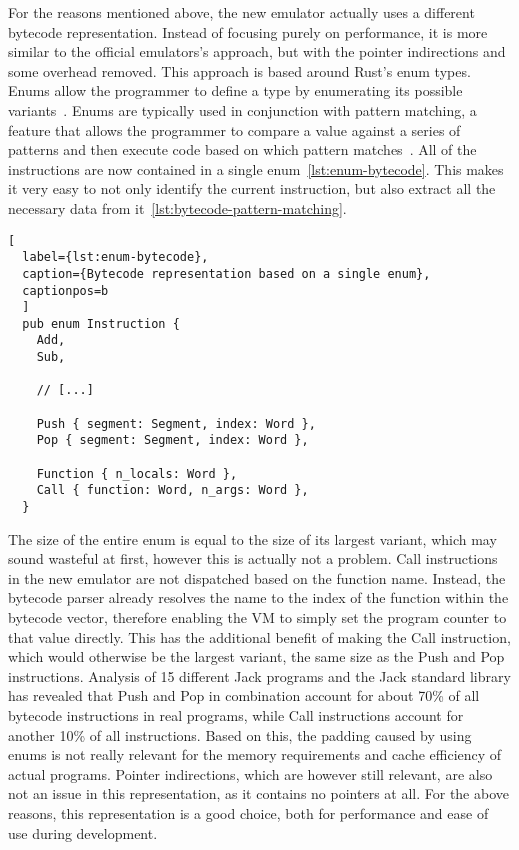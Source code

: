 For the reasons mentioned above, the new emulator actually uses a different bytecode representation. Instead of focusing purely on performance, it is more similar to the official emulators's approach, but with the pointer indirections and some overhead removed.
This approach is based around Rust's enum types. Enums allow the programmer to define a type by enumerating its possible variants~\cite[Chapter~6]{klabnik2019rust}.
Enums are typically used in conjunction with pattern matching, a feature that allows the programmer to compare a value against a series of patterns and then execute code based on which pattern matches~\cite[Chapter~6.2]{klabnik2019rust}.
All of the instructions are now contained in a single enum~\ref{lst:enum-bytecode}.
This makes it very easy to not only identify the current instruction, but also extract all the necessary data from it~\ref{lst:bytecode-pattern-matching}.

\begin{lstlisting}[
  label={lst:enum-bytecode},
  caption={Bytecode representation based on a single enum},
  captionpos=b
  ]
  pub enum Instruction {
    Add,
    Sub,

    // [...]

    Push { segment: Segment, index: Word },
    Pop { segment: Segment, index: Word },

    Function { n_locals: Word },
    Call { function: Word, n_args: Word },
  }
\end{lstlisting}

The size of the entire enum is equal to the size of its largest variant, which may sound wasteful at first, however this is actually not a problem.
Call instructions in the new emulator are not dispatched based on the function name. Instead, the bytecode parser already resolves the name to the index of the function within the bytecode vector, therefore enabling the VM to simply set the program counter to that value directly.
This has the additional benefit of making the Call instruction, which would otherwise be the largest variant, the same size as the Push and Pop instructions.
Analysis of 15 different Jack programs and the Jack standard library has revealed that Push and Pop in combination account for about 70\% of all bytecode instructions in real programs, while Call instructions account for another 10\% of all instructions.
Based on this, the padding caused by using enums is not really relevant for the memory requirements and cache efficiency of actual programs.
Pointer indirections, which are however still relevant, are also not an issue in this representation, as it contains no pointers at all.
For the above reasons, this representation is a good choice, both for performance and ease of use during development.

